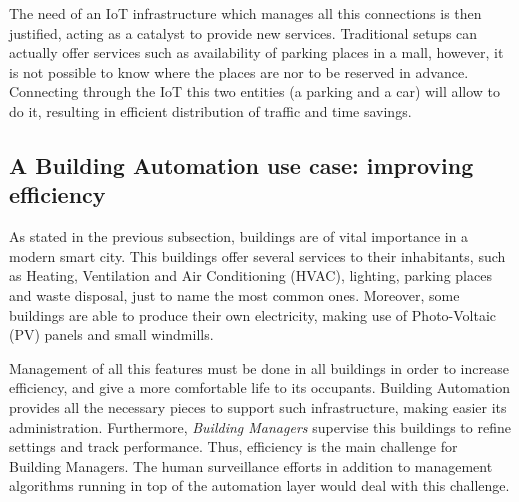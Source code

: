 The need of an IoT infrastructure which manages all this connections is then justified, acting as a catalyst to provide new services.
Traditional setups can actually offer services such as availability of parking places in a mall, however, it is not possible to know where the places are nor to be reserved in advance.
Connecting through the IoT this two entities (a parking and a car) will allow to do it, resulting in efficient distribution of traffic and time savings.

\subsection{A Building Automation use case: improving efficiency}
\label{sec:BAScenario}
As stated in the previous subsection, buildings are of vital importance in a modern smart city.
This buildings offer several services to their inhabitants, such as Heating, Ventilation and Air Conditioning (HVAC), lighting, parking places and waste disposal, just to name the most common ones.
Moreover, some buildings are able to produce their own electricity, making use of Photo-Voltaic (PV) panels and small windmills.

Management of all this features must be done in all buildings in order to increase efficiency, and give a more comfortable life to its occupants.
Building Automation provides all the necessary pieces to support such infrastructure, making easier its administration.
Furthermore, \textit{Building Managers} supervise this buildings to refine settings and track performance.
Thus, efficiency is the main challenge for Building Managers.
The human surveillance efforts in addition to management algorithms running in top of the automation layer would deal with this challenge.


